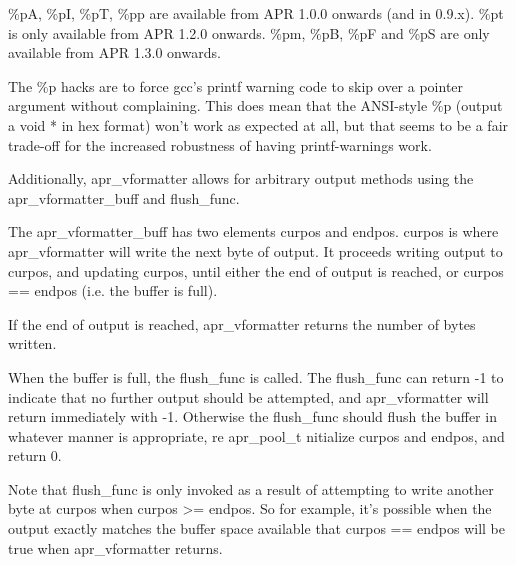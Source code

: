 \begin{DoxyPre}\%pA, \%pI, \%pT, \%pp are available from APR 1.0.0 onwards (and in 0.9.x).
\%pt is only available from APR 1.2.0 onwards.
\%pm, \%pB, \%pF and \%pS are only available from APR 1.3.0 onwards.\end{DoxyPre}



\begin{DoxyPre}The \%p hacks are to force gcc's printf warning code to skip
over a pointer argument without complaining.  This does
mean that the ANSI-style \%p (output a void * in hex format) won't
work as expected at all, but that seems to be a fair trade-off
for the increased robustness of having printf-warnings work.\end{DoxyPre}



\begin{DoxyPre}Additionally, apr\_vformatter allows for arbitrary output methods
using the apr\_vformatter\_buff and flush\_func.\end{DoxyPre}



\begin{DoxyPre}The apr\_vformatter\_buff has two elements curpos and endpos.
curpos is where apr\_vformatter will write the next byte of output.
It proceeds writing output to curpos, and updating curpos, until
either the end of output is reached, or curpos == endpos (i.e. the
buffer is full).\end{DoxyPre}



\begin{DoxyPre}If the end of output is reached, apr\_vformatter returns the
number of bytes written.\end{DoxyPre}



\begin{DoxyPre}When the buffer is full, the flush\_func is called.  The flush\_func
can return -1 to indicate that no further output should be attempted,
and apr\_vformatter will return immediately with -1.  Otherwise
the flush\_func should flush the buffer in whatever manner is
appropriate, re apr\_pool\_t nitialize curpos and endpos, and return 0.\end{DoxyPre}



\begin{DoxyPre}Note that flush\_func is only invoked as a result of attempting to
write another byte at curpos when curpos >= endpos.  So for
example, it's possible when the output exactly matches the buffer
space available that curpos == endpos will be true when
apr\_vformatter returns.\end{DoxyPre}



